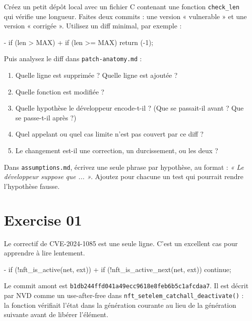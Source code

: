 \documentclass{training}
\begin{document}
Créez un petit dépôt local avec un fichier C contenant une fonction
\verb|check_len| qui vérifie une longueur. Faites deux commits : une version
« vulnerable » et une version « corrigée ». Utilisez un diff minimal, par
exemple :

\begin{console}
- if (len > MAX)
+ if (len >= MAX)
      return (-1);
\end{console}

Puis analysez le diff dans \texttt{patch-anatomy.md} :

\begin{enumerate}
  \item Quelle ligne est supprimée ? Quelle ligne est ajoutée ?
  \item Quelle fonction est modifiée ?
  \item Quelle hypothèse le développeur encode-t-il ? (Que se passait-il
        avant ? Que se passe-t-il après ?)
  \item Quel appelant ou quel cas limite n'est pas couvert par ce diff ?
  \item Le changement est-il une correction, un durcissement, ou les deux ?
\end{enumerate}

Dans \texttt{assumptions.md}, écrivez une seule phrase par hypothèse, au
format : \emph{« Le développeur suppose que ... »}. Ajoutez pour chacune un
test qui pourrait rendre l'hypothèse fausse.


\chapter{Exercise 01}
\makeheaderfiles

Le correctif de CVE-2024-1085 est une seule ligne. C'est un excellent cas
pour apprendre à lire lentement.

\begin{console}
- if (!nft_is_active(net, ext))
+ if (!nft_is_active_next(net, ext))
      continue;
\end{console}

Le commit amont est \texttt{b1db244ffd041a49ecc9618e8feb6b5c1afcdaa7}. Il
est décrit par NVD comme un use-after-free dans
\texttt{nft\_setelem\_catchall\_deactivate()} : la fonction vérifiait l'état
dans la génération courante au lieu de la génération suivante avant de
libérer l'élément.
\end{document}
